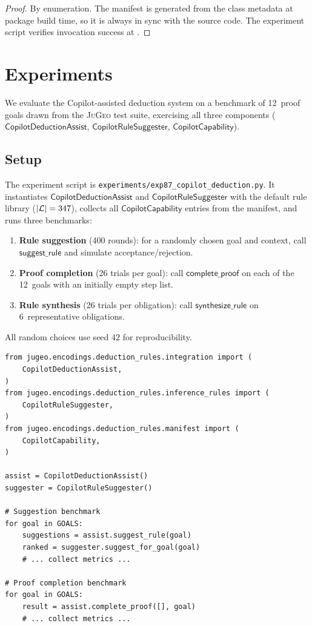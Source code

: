 \documentclass[11pt]{article}
\newcommand{\CDA}{\ensuremath{\mathsf{CopilotDeductionAssist}}}
\newcommand{\CRS}{\ensuremath{\mathsf{CopilotRuleSuggester}}}
\newcommand{\CC}{\ensuremath{\mathsf{CopilotCapability}}}
\newcommand{\JG}{\textsc{JuGeo}}
\newcommand{\suggestRule}{\ensuremath{\mathsf{suggest\_rule}}}
\newcommand{\completeProof}{\ensuremath{\mathsf{complete\_proof}}}
\newcommand{\synthesizeRule}{\ensuremath{\mathsf{synthesize\_rule}}}
\begin{document}
\begin{proof}
  By enumeration.  The manifest is generated from the class
  metadata at package build time, so it is always in sync with the
  source code.  The experiment script verifies invocation success
  at \ppLXXXVIIcapabilityInvokeSuccess.
\end{proof}


\section{Experiments}\label{sec:experiments}

We evaluate the Copilot-assisted deduction system on a benchmark
of 12~proof goals drawn from the \JG{} test suite, exercising
all three components ($\CDA$, $\CRS$, $\CC$).

\subsection{Setup}\label{ssec:setup}

The experiment script is
\texttt{experiments/exp87\_copilot\_deduction.py}.  It instantiates
$\CDA$ and $\CRS$ with the default rule library
($|\mathcal{L}| = 347$), collects all $\CC$
entries from the manifest, and runs three benchmarks:
\begin{enumerate}
  \item \textbf{Rule suggestion} (400 rounds): for a randomly
    chosen goal and context, call $\suggestRule$ and simulate
    acceptance/rejection.
  \item \textbf{Proof completion} (26 trials per goal): call
    $\completeProof$ on each of the 12~goals with an initially
    empty step list.
  \item \textbf{Rule synthesis} (26 trials per obligation): call
    $\synthesizeRule$ on 6~representative obligations.
\end{enumerate}
All random choices use seed $42$ for reproducibility.

\begin{lstlisting}[style=jugeo-python,
  caption={Experiment driver (simplified).},label=lst:exp]
from jugeo.encodings.deduction_rules.integration import (
    CopilotDeductionAssist,
)
from jugeo.encodings.deduction_rules.inference_rules import (
    CopilotRuleSuggester,
)
from jugeo.encodings.deduction_rules.manifest import (
    CopilotCapability,
)

assist = CopilotDeductionAssist()
suggester = CopilotRuleSuggester()

# Suggestion benchmark
for goal in GOALS:
    suggestions = assist.suggest_rule(goal)
    ranked = suggester.suggest_for_goal(goal)
    # ... collect metrics ...

# Proof completion benchmark
for goal in GOALS:
    result = assist.complete_proof([], goal)
    # ... collect metrics ...
\end{lstlisting}
\end{document}
